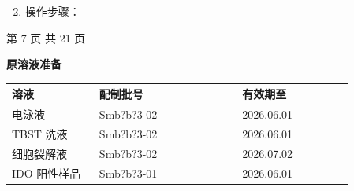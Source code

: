 \documentclass[UTF8,10pt,a4paper,fontset=fandol]{ctexart}
\newcommand{\fieldvalue}[1]{#1}
\newcommand{\handwritten}[1]{#1}
\begin{document}
\begin{enumerate}
\setcounter{enumi}{1}
\item 操作步骤：
\end{enumerate}

\begin{center}
第 7 页 共 21 页
\end{center}

\newpage

\begin{center}
\textbf{原溶液准备}
\end{center}

\begin{tabular}{|p{0.22\linewidth}|p{0.36\linewidth}|p{0.28\linewidth}|}
\hline
溶液 & 配制批号 & 有效期至 \\
\hline
电泳液 &
\fieldvalue{\handwritten{Smb?b?3-02}} &
\fieldvalue{\handwritten{2026.06.01}} \\
\hline
TBST 洗液 &
\fieldvalue{\handwritten{Smb?b?3-02}} &
\fieldvalue{\handwritten{2026.06.01}} \\
\hline
细胞裂解液 &
\fieldvalue{\handwritten{Smb?b?3-02}} &
\fieldvalue{\handwritten{2026.07.02}} \\
\hline
IDO 阳性样品 &
\fieldvalue{\handwritten{Smb?b?3-01}} &
\fieldvalue{\handwritten{2026.06.01}} \\
\hline
\end{tabular}

\vspace{0.4em}
\end{document}
